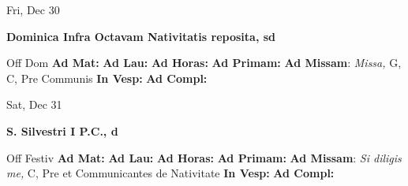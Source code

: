 \documentclass[10pt]{article}
\begin{document}
\begin{minipage}{3.5in}
\vspace{2em}\begin{center}
Fri, Dec 30
\end{center}\textbf{ \large Dominica Infra Octavam Nativitatis reposita, \textnormal{\normalsize sd}}
\begin{justify}
Off Dom
\textbf{Ad Mat: }
\textbf{Ad Lau: }
\textbf{Ad Horas: }
\textbf{Ad Primam: }
\textbf{Ad Missam}: \textit{Missa,} G, C, Pre Communis
\textbf{In Vesp: }
\textbf{Ad Compl: }\end{justify}
\end{minipage}



\begin{minipage}{3.5in}
\vspace{2em}\begin{center}
Sat, Dec 31
\end{center}\textbf{ \large S. Silvestri I P.C., \textnormal{\normalsize d}}
\begin{justify}
Off Festiv
\textbf{Ad Mat: }
\textbf{Ad Lau: }
\textbf{Ad Horas: }
\textbf{Ad Primam: }
\textbf{Ad Missam}: \textit{Si diligis me,} C, Pre et Communicantes de Nativitate
\textbf{In Vesp: }
\textbf{Ad Compl: }\end{justify}
\end{minipage}
\end{document}
